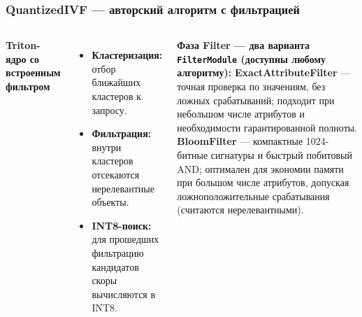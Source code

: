 \documentclass[aspectratio=169,9pt]{beamer}
\begin{document}
\begin{frame}
\frametitle{QuantizedIVF --- авторский алгоритм с фильтрацией}

\begin{columns}[T]
  \textbf{Triton-ядро со встроенным фильтром}
  \begin{itemize}
    \item \textbf{Кластеризация:} отбор ближайших кластеров к запросу.
    \item \textbf{Фильтрация:} внутри кластеров отсекаются нерелевантные объекты.
    \item \textbf{INT8-поиск:} для прошедших фильтрацию кандидатов скоры вычисляются в INT8.
  \end{itemize}

  \vspace{0.8em}
  {\footnotesize
  \textbf{Фаза Filter --- два варианта \texttt{FilterModule} (доступны любому алгоритму):}
  \textbf{ExactAttributeFilter} --- точная проверка по значениям, без ложных
  срабатываний; подходит при небольшом числе атрибутов и необходимости
  гарантированной полноты.
  \textbf{BloomFilter} --- компактные 1024-битные сигнатуры и быстрый побитовый
  AND; оптимален для экономии памяти при большом числе атрибутов,
  допуская ложноположительные срабатывания (считаются нерелевантными).
  \par}


\end{columns}
\end{frame}
\end{document}
